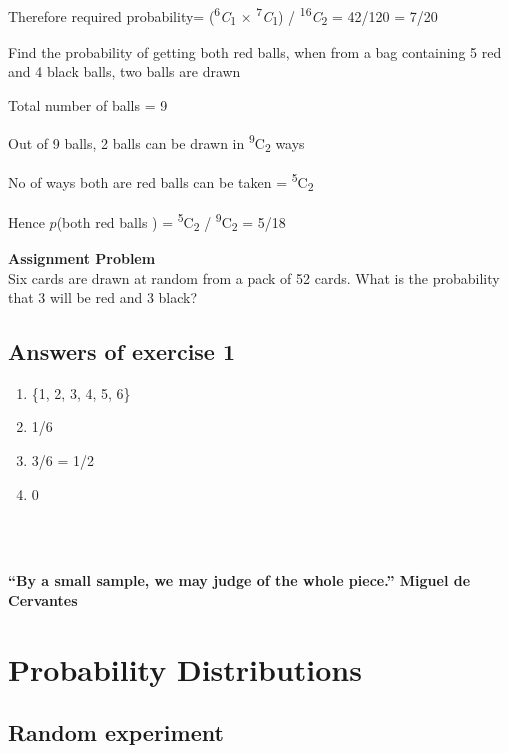 \documentclass[
]{book}
\begin{document}
Therefore required probability= (\textsuperscript{6}\emph{C}\textsubscript{1} × \textsuperscript{7}\emph{C}\textsubscript{1}) / \textsuperscript{16}\emph{C}\textsubscript{2} = 42/120 = 7/20

Find the probability of getting both red balls, when from a bag containing 5 red and 4 black balls, two balls are drawn

Total number of balls = 9

Out of 9 balls, 2 balls can be drawn in \textsuperscript{9}C\textsubscript{2} ways

No of ways both are red balls can be taken = \textsuperscript{5}C\textsubscript{2}

Hence \(p\)(both red balls ) = \textsuperscript{5}C\textsubscript{2} / \textsuperscript{9}C\textsubscript{2} = 5/18

\begin{rmdnote}
\textbf{Assignment Problem}\\
Six cards are drawn at random from a pack of 52 cards. What is the probability that 3 will be red and 3 black?
\end{rmdnote}

\hypertarget{answer}{%
\section{Answers of exercise 1}\label{answer}}

\begin{enumerate}
\def\labelenumi{\arabic{enumi}.}
\item
  \{1, 2, 3, 4, 5, 6\}
\item
  1/6
\item
  3/6 = 1/2
\item
  0
\end{enumerate}

~\\
\hspace*{0.333em}\\
\hspace*{0.333em}

\hypertarget{hello}{}
\textbf{``By a small sample, we may judge of the whole piece.'' Miguel de Cervantes}

\hypertarget{probability-distributions}{%
\chapter{Probability Distributions}\label{probability-distributions}}

\hypertarget{random-experiment}{%
\section{Random experiment}\label{random-experiment}}
\end{document}
